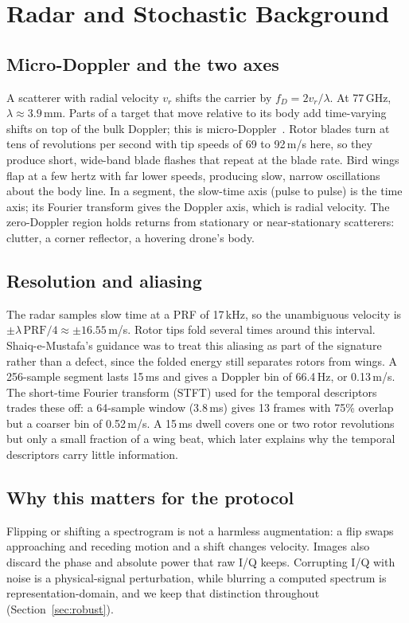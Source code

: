 \documentclass[conference]{IEEEtran}
\begin{document}
\section{Radar and Stochastic Background}
\subsection{Micro-Doppler and the two axes}
A scatterer with radial velocity $v_r$ shifts the carrier by $f_D = 2v_r/\lambda$. At 77\,GHz, $\lambda \approx 3.9$\,mm. Parts of a target that move relative to its body add time-varying shifts on top of the bulk Doppler; this is micro-Doppler~\cite{chen2006}. Rotor blades turn at tens of revolutions per second with tip speeds of 69 to 92\,m/s here, so they produce short, wide-band blade flashes that repeat at the blade rate. Bird wings flap at a few hertz with far lower speeds, producing slow, narrow oscillations about the body line. In a segment, the slow-time axis (pulse to pulse) is the time axis; its Fourier transform gives the Doppler axis, which is radial velocity. The zero-Doppler region holds returns from stationary or near-stationary scatterers: clutter, a corner reflector, a hovering drone's body.

\subsection{Resolution and aliasing}
The radar samples slow time at a PRF of 17\,kHz, so the unambiguous velocity is $\pm\lambda\,\mathrm{PRF}/4 \approx \pm16.55$\,m/s. Rotor tips fold several times around this interval. Shaiq-e-Mustafa's guidance was to treat this aliasing as part of the signature rather than a defect, since the folded energy still separates rotors from wings. A 256-sample segment lasts 15\,ms and gives a Doppler bin of 66.4\,Hz, or 0.13\,m/s. The short-time Fourier transform (STFT) used for the temporal descriptors trades these off: a 64-sample window (3.8\,ms) gives 13 frames with 75\% overlap but a coarser bin of 0.52\,m/s. A 15\,ms dwell covers one or two rotor revolutions but only a small fraction of a wing beat, which later explains why the temporal descriptors carry little information.

\subsection{Why this matters for the protocol}
Flipping or shifting a spectrogram is not a harmless augmentation: a flip swaps approaching and receding motion and a shift changes velocity. Images also discard the phase and absolute power that raw I/Q keeps. Corrupting I/Q with noise is a physical-signal perturbation, while blurring a computed spectrum is representation-domain, and we keep that distinction throughout (Section~\ref{sec:robust}).
\end{document}
